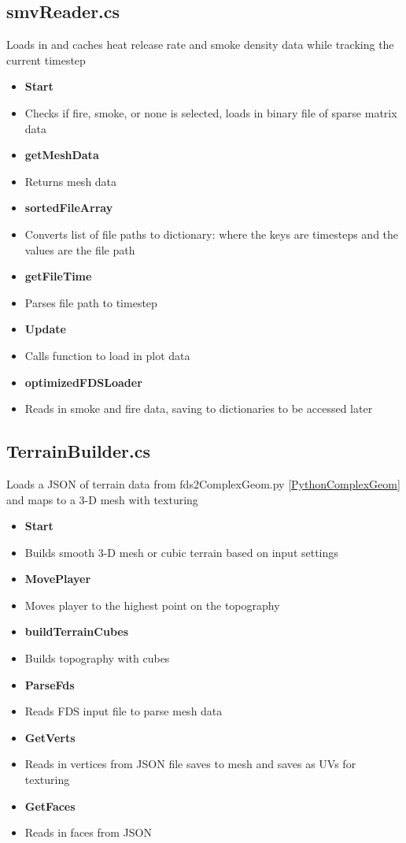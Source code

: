 \subsection{smvReader.cs}
Loads in and caches heat release rate and smoke density data while tracking the current timestep
\begin{itemize}
    \item\textbf{Start}
    \item[] Checks if fire, smoke, or none is selected, loads in binary file of sparse matrix data

    \item\textbf{getMeshData}
    \item[] Returns mesh data

    \item\textbf{sortedFileArray}
    \item[] Converts list of file paths to dictionary: where the keys are timesteps and the values are the file path
    

    \item\textbf{getFileTime}
    \item[] Parses file path to timestep
    
    \item\textbf{Update}
    \item[] Calls function to load in plot data
    
    \item\textbf{optimizedFDSLoader}
    \item[] Reads in smoke and fire data, saving to dictionaries to be accessed later
\end{itemize}

  
\subsection{TerrainBuilder.cs}
Loads a JSON of terrain data from fds2ComplexGeom.py \ref{PythonComplexGeom} and maps to a 3-D mesh with texturing
\begin{itemize}
    \item \textbf{Start}
    \item[] Builds smooth 3-D mesh or cubic terrain based on input settings

    \item\textbf{MovePlayer}
    \item[] Moves player to the highest point on the topography
    
    \item\textbf{buildTerrainCubes}
    \item[] Builds topography with cubes
    \item\textbf{ParseFds}
    \item[] Reads FDS input file to parse mesh data
    
    \item\textbf{GetVerts}
    \item[] Reads in vertices from JSON file saves to mesh and saves as UVs for texturing 
    
    \item\textbf{GetFaces}
    \item[] Reads in faces from JSON
\end{itemize}


